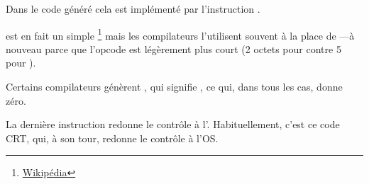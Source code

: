 Dans le code généré cela est implémenté par l'instruction .


\XOR est en fait un simple \footnote{\href{http://go.yurichev.com/17118}{Wikipédia}} mais
les compilateurs l'utilisent souvent à la place de ---à nouveau parce que l'opcode est légèrement plus
court (2 octets pour \XOR contre 5 pour \MOV).

Certains compilateurs génèrent , qui signifie  \EAX {} \EAX,
 ce qui, dans tous les cas, donne zéro.

La dernière instruction \RET redonne le contrôle à l'.
Habituellement, c'est ce code \CCpp \ac{CRT}, qui, à son tour, redonne le contrôle à l'\ac{OS}.

